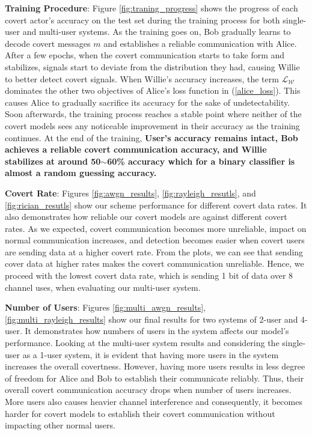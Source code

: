 \textbf{Training Procedure}: Figure \ref{fig:traning_progress} shows the progress of each covert actor's accuracy on the test set during the training process for both single-user and multi-user systems. As the training goes on, Bob gradually learns to decode covert messages \(m\) and establishes a reliable communication with Alice. After a few epochs, when the covert communication starts to take form and stabilizes, signals start to deviate from the distribution they had, causing Willie to better detect covert signals. When Willie's accuracy increases, the term \(\mathcal{L}_{\mathcal{W}}\) dominates the other two objectives of Alice's loss function in (\ref{alice_loss}). This causes Alice to gradually sacrifice its accuracy for the sake of undetectability. Soon afterwards, the training process reaches a stable point where neither of the covert models sees any noticeable improvement in their accuracy as the training continues. At the end of the training, \textbf{User's accuracy remains intact, Bob achieves a reliable covert communication accuracy, and Willie stabilizes at around 50$\sim$60\% accuracy which for a binary classifier is almost a random guessing accuracy.}

\textbf{Covert Rate}: Figures \ref{fig:awgn_results}, \ref{fig:rayleigh_resutls}, and \ref{fig:rician_resutls} show our scheme performance for different covert data rates. It also demonstrates how reliable our covert models are against different covert rates. As we expected, covert communication becomes more unreliable, impact on normal communication increases, and detection becomes easier when covert users are sending data at a higher covert rate. From the plots, we can see that sending cover data at higher rates makes the covert communication unreliable. Hence, we proceed with the lowest covert data rate, which is sending 1 bit of data over 8 channel uses, when evaluating our multi-user system.

\textbf{Number of Users}: Figures \ref{fig:multi_awgn_results}, \ref{fig:multi_rayleigh_results} show our final results for two systems of 2-user and 4-user. It demonstrates how numbers of users in the system affects our model's performance. Looking at the multi-user system results and considering the single-user as a 1-user system, it is evident that having more users in the system increases the overall covertness. However, having more users results in less degree of freedom for Alice and Bob to establish their communicate reliably. Thus, their overall covert communication accuracy drops when number of users increases. More users also causes heavier channel interference and consequently, it becomes harder for covert models to establish their covert communication without impacting other normal users.


